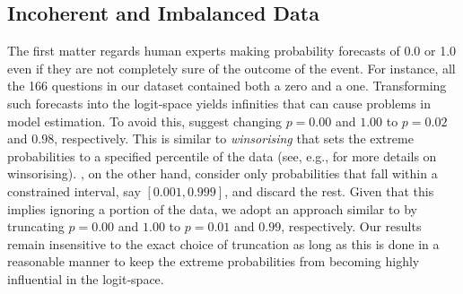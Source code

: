 \documentclass[aoas, preprint]{imsart}
\numberwithin{equation}{section}
\theoremstyle{plain}
\begin{document}
\subsection{Incoherent and Imbalanced Data}
\label{practicalMatters}
The first matter regards human experts making probability forecasts of 0.0 or 1.0 even if they are not completely sure of the outcome of the event. For instance, all the 166 questions in our dataset contained both a zero and a one. Transforming such forecasts into the logit-space yields infinities that can cause problems in model estimation. To avoid this, \citet{Ariely00theeffects} suggest changing $p = 0.00$ and $1.00$ to $p = 0.02$ and $0.98$, respectively. This is similar to \textit{winsorising} that sets the extreme probabilities to a specified percentile of the data (see, e.g., \citet{hastings1947low} for more details on winsorising).  \citet{Geo}, on the other hand, consider only probabilities that fall within a constrained interval, say $[0.001, 0.999]$, and discard the rest. Given that this implies ignoring a portion of the data, we adopt an approach similar to \citet{Ariely00theeffects}  by truncating $p = 0.00$ and $1.00$ to $p = 0.01$ and $0.99$, respectively.  Our results remain insensitive to the exact choice of truncation as long as this is done in a reasonable manner to keep the extreme probabilities from becoming highly influential in the logit-space.  
\end{document}
